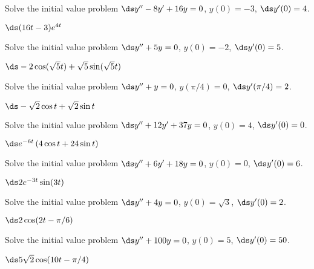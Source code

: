 \begin{enumialphparenastyle}
\begin{ex}
 Solve the initial value problem 
$\ds y''-8y'+16y=0$,
$y(0)=-3$, $\ds y'(0)=4$.
\begin{sol}
 $\ds (16t-3)e^{4t}$
\end{sol}
\end{ex}


\begin{ex}
 Solve the initial value problem 
$\ds y''+5y=0$,
$y(0)=-2$, $\ds y'(0)=5$.
\begin{sol}
 $\ds -2\cos(\sqrt5t)+\sqrt{5}\sin(\sqrt{5}t)$
\end{sol}
\end{ex}


\begin{ex}
 Solve the initial value problem 
$\ds y''+y=0$,
$y(\pi/4)=0$, $\ds y'(\pi/4)=2$.
\begin{sol}
 $\ds -\sqrt2\cos t+\sqrt2\sin t$
\end{sol}
\end{ex}


\begin{ex}
 Solve the initial value problem 
$\ds y''+12y'+37y=0$,
$y(0)=4$, $\ds y'(0)=0$.
\begin{sol}
 $\ds e^{-6t}\left(4\cos t+24\sin t\right)$
\end{sol}
\end{ex}


\begin{ex}
 Solve the initial value problem 
$\ds y''+6y'+18y=0$,
$y(0)=0$, $\ds y'(0)=6$.
\begin{sol}
 $\ds 2e^{-3t}\sin(3t)$
\end{sol}
\end{ex}


\begin{ex}
 Solve the initial value problem 
$\ds y''+4y=0$,
$y(0)=\sqrt3$, $\ds y'(0)=2$. 
\begin{sol}
 $\ds 2\cos(2t-\pi/6)$
\end{sol}
\end{ex}


\begin{ex}
 Solve the initial value problem 
$\ds y''+100y=0$,
$y(0)=5$, $\ds y'(0)=50$. 
\begin{sol}
 $\ds 5\sqrt2\cos(10t-\pi/4)$
\end{sol}
\end{ex}



\end{enumialphparenastyle}
